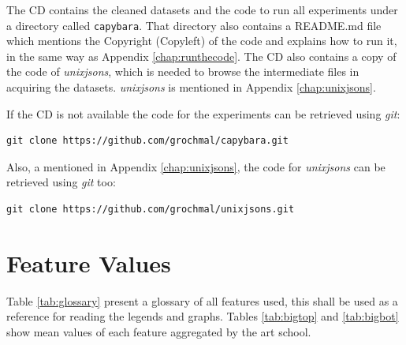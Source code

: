 \documentclass[11pt,a4paper,twoside,openright,draft]{report}
\begin{document}
The CD contains the cleaned datasets and the code to run all experiments under
a directory called \texttt{capybara}.  That directory also contains a README.md
file which mentions the Copyright (Copyleft) of the code and explains how to
run it, in the same way as Appendix \ref{chap:runthecode}.  The CD also
contains a copy of the code of \emph{unixjsons}, which is needed to browse the
intermediate files in acquiring the datasets.  \emph{unixjsons} is mentioned in
Appendix \ref{chap:unixjsons}.

If the CD is not available the code for the experiments can be retrieved using
\emph{git}:

\begin{verbatim}
git clone https://github.com/grochmal/capybara.git
\end{verbatim}

Also, a mentioned in Appendix \ref{chap:unixjsons}, the code for
\emph{unixjsons} can be retrieved using \emph{git} too:

\begin{verbatim}
git clone https://github.com/grochmal/unixjsons.git
\end{verbatim}

\chapter{Feature Values}
\label{chap:glossary}

Table \ref{tab:glossary} present a glossary of all features used, this shall be
used as a reference for reading the legends and graphs.  Tables
\ref{tab:bigtop} and \ref{tab:bigbot} show mean values of each feature
aggregated by the art school.
\end{document}
